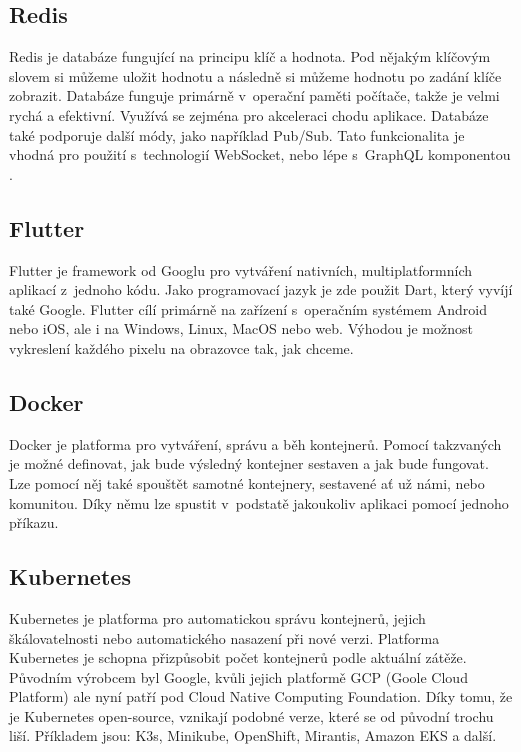 \subsection{Redis}
Redis je databáze fungující na principu klíč a hodnota. Pod nějakým klíčovým slovem si můžeme uložit hodnotu a následně si můžeme hodnotu po zadání klíče zobrazit. Databáze funguje primárně v~operační paměti počítače, takže je velmi rychá a efektivní. Využívá se zejména pro akceleraci chodu aplikace. Databáze také podporuje další módy, jako například Pub/Sub\cite{PubSub}. Tato funkcionalita je vhodná pro použití s~technologií WebSocket, nebo lépe s~GraphQL komponentou . \cite{Redis}

\subsection{Flutter}
Flutter je framework od Googlu pro vytváření nativních, multiplatformních aplikací z~jednoho kódu. Jako programovací jazyk je zde použit Dart, který vyvíjí také Google. Flutter cílí primárně na zařízení s~operačním systémem Android nebo iOS, ale i na Windows, Linux, MacOS nebo web. Výhodou je možnost vykreslení každého pixelu na obrazovce tak, jak chceme. \cite{Flutter}

\subsection{Docker}
Docker je platforma pro vytváření, správu a běh kontejnerů. Pomocí takzvaných  je možné definovat, jak bude výsledný kontejner sestaven a jak bude fungovat. Lze pomocí něj také spouštět samotné kontejnery, sestavené ať už námi, nebo komunitou. Díky němu lze spustit v~podstatě jakoukoliv aplikaci pomocí jednoho příkazu. \cite{Docker}

\subsection{Kubernetes}
Kubernetes je platforma pro automatickou správu kontejnerů, jejich škálovatelnosti nebo automatického nasazení při nové verzi. Platforma Kubernetes je schopna přizpůsobit počet kontejnerů podle aktuální zátěže. 
Původním výrobcem byl Google, kvůli jejich platformě GCP (Goole Cloud Platform) ale nyní patří pod Cloud Native Computing Foundation. Díky tomu, že je Kubernetes open-source, vznikají podobné verze, které se od původní trochu liší. Příkladem jsou: K3s, Minikube, OpenShift, Mirantis, Amazon EKS a další. \cite{Kubernetes}

